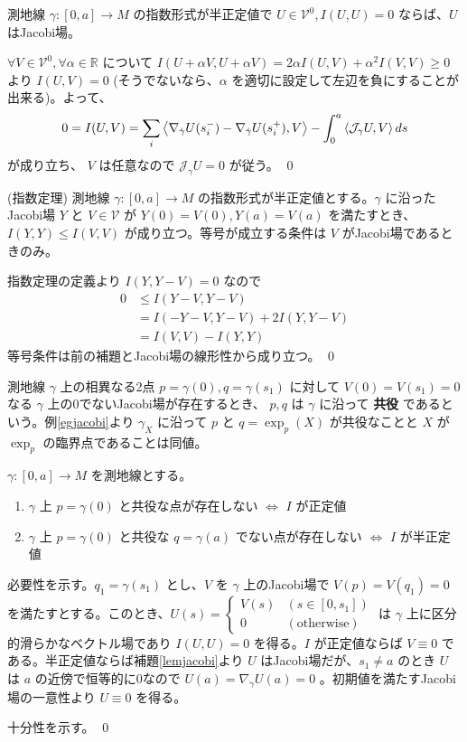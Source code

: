 \documentclass[dvipdfmx,a4paper]{jsreport}
\theoremstyle{definition}
\begin{document}
\lem\label{lemjacobi} 測地線 $\gamma:[0,a] \to M$ の指数形式が半正定値で $U \in \mathcal{V}^0,I(U,U)=0$ ならば、$U$ はJacobi場。

\prf $\forall V \in \mathcal{V}^0,\forall \alpha \in \mathbb{R}$ について $I(U+\alpha V,U+\alpha V)=2\alpha I(U,V)+\alpha^2I(V,V)\geq 0$ より $I(U,V) =0$ (そうでないなら、$\alpha$ を適切に設定して左辺を負にすることが出来る)。よって、
\begin{align*}
    0=I(U,V)=\sum_i \ev{\nabla_{\dot{\gamma}}U(s_i^-)-\nabla_{\dot{\gamma}}U(s_i^+),V}-\int_0^a \ev{\mathcal{J}_\gamma U,V} ds
\end{align*}
が成り立ち、 $V$ は任意なので $\mathcal{J}_\gamma U=0$ が従う。 \qed

\lem\label{index} (指数定理) 測地線 $\gamma:[0,a] \to M$ の指数形式が半正定値とする。$\gamma$ に沿ったJacobi場 $Y$ と $V \in \mathcal{V}$ が $Y(0)=V(0),Y(a)=V(a)$ を満たすとき、$I(Y,Y) \leq I(V,V)$ が成り立つ。等号が成立する条件は $V$ がJacobi場であるときのみ。

\prf 指数定理の定義より $I(Y,Y-V)=0$ なので
\begin{align*}
    0 &\leq I(Y-V,Y-V) \\
    &=I(-Y-V,Y-V)+2I(Y,Y-V) \\
    &=I(V,V)-I(Y,Y)
\end{align*}
等号条件は前の補題とJacobi場の線形性から成り立つ。 \qed

 測地線 $\gamma$ 上の相異なる2点 $p=\gamma(0),q=\gamma(s_1)$ に対して $V(0)=V(s_1)=0$ なる $\gamma$ 上の0でないJacobi場が存在するとき、 $p,q$ は $\gamma$ に沿って \textbf{共役} であるという。例\ref{egjacobi}より $\gamma_X$ に沿って $p$ と $q=\exp_p(X)$ が共役なことと $X$ が $\exp_p$ の臨界点であることは同値。

\prop $\gamma:[0,a] \to M$ を測地線とする。
\begin{enumerate}
    \item $\gamma$ 上 $p=\gamma(0)$ と共役な点が存在しない $\iff$ $I$ が正定値
    \item $\gamma$ 上 $p=\gamma(0)$ と共役な $q=\gamma(a)$ でない点が存在しない $\iff$ $I$ が半正定値
\end{enumerate}

\prf 必要性を示す。$q_1=\gamma(s_1)$ とし、$V$ を $\gamma$ 上のJacobi場で $V(p)=V(q_1)=0$ を満たすとする。このとき、$U(s)=\begin{cases}
    V(s)&(s \in [0,s_1]) \\
    0 & (\mbox{otherwise})
\end{cases}$ は $\gamma$ 上に区分的滑らかなベクトル場であり $I(U,U)=0$ を得る。$I$ が正定値ならば $V \equiv 0$ である。半正定値ならば補題\ref{lemjacobi}より $U$ はJacobi場だが、$s_1 \neq a$ のとき $U$ は $a$ の近傍で恒等的に0なので $U(a)=\nabla_{\dot{\gamma}}U(a)=0$ 。初期値を満たすJacobi場の一意性より $U \equiv 0$ を得る。

十分性を示す。%
\qed
\end{document}
